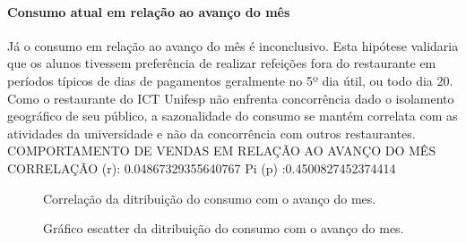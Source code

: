 \documentclass[	12pt, Times, openright, twoside, a4paper, english, brazil]{abntex2}
\begin{document}
              \paragraph{Consumo atual em relação ao avanço do mês}
                Já o consumo em relação ao avanço do mês é inconclusivo. Esta hipótese validaria que os alunos tivessem preferência de realizar refeições fora do restaurante em períodos típicos de dias de pagamentos geralmente no 5º dia útil, ou todo dia 20. Como o restaurante do ICT Unifesp não enfrenta concorrência dado o isolamento geográfico de seu público, a sazonalidade do consumo se mantém correlata com as atividades da universidade e não da concorrência com outros restaurantes.\newline
                COMPORTAMENTO DE VENDAS EM RELAÇÃO AO AVANÇO DO MÊS\newline
                CORRELAÇÃO (r): 0.04867329355640767\newline
                Pi (p) :0.4500827452374414\newline
                \begin{figure}[!ht]
                    	\caption{Correlação da ditribuição do consumo com o avanço do mes. \label{fig:case1_perc_mes} }
                    \end{figure}
                
                \begin{figure}[!ht]
                	\caption{Gráfico escatter da ditribuição do consumo com o avanço do mes. \label{fig:case1_perc_mes_scatter} }
                \end{figure}
\end{document}
